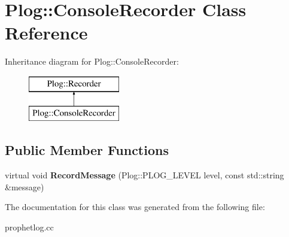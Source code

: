 \hypertarget{classPlog_1_1ConsoleRecorder}{
\section{Plog::ConsoleRecorder Class Reference}
\label{classPlog_1_1ConsoleRecorder}
}
Inheritance diagram for Plog::ConsoleRecorder:\begin{figure}[H]
\begin{center}
\leavevmode
\includegraphics[height=2cm]{classPlog_1_1ConsoleRecorder}
\end{center}
\end{figure}
\subsection*{Public Member Functions}
\begin{DoxyCompactItemize}
\item 
\hypertarget{classPlog_1_1ConsoleRecorder_af898bdabf81b18ef3b7116e21be5dd83}{
virtual void {\bfseries RecordMessage} (Plog::PLOG\_\-LEVEL level, const std::string \&message)}
\label{classPlog_1_1ConsoleRecorder_af898bdabf81b18ef3b7116e21be5dd83}

\end{DoxyCompactItemize}


The documentation for this class was generated from the following file:\begin{DoxyCompactItemize}
\item 
prophetlog.cc\end{DoxyCompactItemize}
